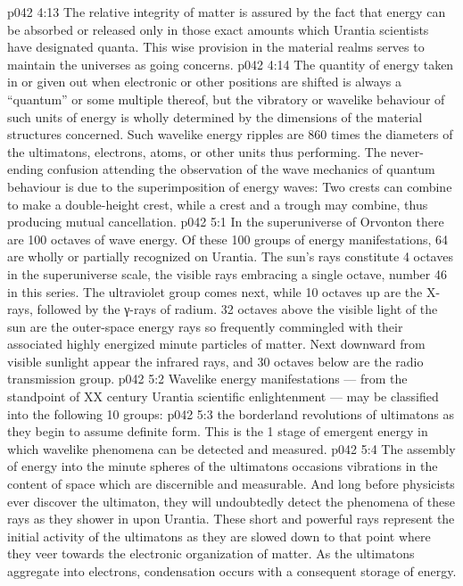 \vs p042 4:13 \pc The relative integrity of matter is assured by the fact that energy can be absorbed or released only in those exact amounts which Urantia scientists have designated quanta. This wise provision in the material realms serves to maintain the universes as going concerns.
\vs p042 4:14 The quantity of energy taken in or given out when electronic or other positions are shifted is always a “quantum” or some multiple thereof, but the vibratory or wavelike behaviour of such units of energy is wholly determined by the dimensions of the material structures concerned. Such wavelike energy ripples are 860 times the diameters of the ultimatons, electrons, atoms, or other units thus performing. The never\hyp{}ending confusion attending the observation of the wave mechanics of quantum behaviour is due to the superimposition of energy waves: Two crests can combine to make a double\hyp{}height crest, while a crest and a trough may combine, thus producing mutual cancellation.
\vs p042 5:1 In the superuniverse of Orvonton there are 100 octaves of wave energy. Of these 100 groups of energy manifestations, 64 are wholly or partially recognized on Urantia. The sun’s rays constitute 4 octaves in the superuniverse scale, the visible rays embracing a single octave, number 46 in this series. The ultraviolet group comes next, while 10 octaves up are the X\hyp{}rays, followed by the γ-rays of radium. 32 octaves above the visible light of the sun are the outer\hyp{}space energy rays so frequently commingled with their associated highly energized minute particles of matter. Next downward from visible sunlight appear the infrared rays, and 30 octaves below are the radio transmission group.
\vs p042 5:2 \pc Wavelike energy manifestations --- from the standpoint of XX century Urantia scientific enlightenment --- may be classified into the following 10 groups:
\vs p042 5:3 \bibnobreakspace {} the borderland revolutions of ultimatons as they begin to assume definite form. This is the 1 stage of emergent energy in which wavelike phenomena can be detected and measured.
\vs p042 5:4 \bibnobreakspace {} The assembly of energy into the minute spheres of the ultimatons occasions vibrations in the content of space which are discernible and measurable. And long before physicists ever discover the ultimaton, they will undoubtedly detect the phenomena of these rays as they shower in upon Urantia. These short and powerful rays represent the initial activity of the ultimatons as they are slowed down to that point where they veer towards the electronic organization of matter. As the ultimatons aggregate into electrons, condensation occurs with a consequent storage of energy.
